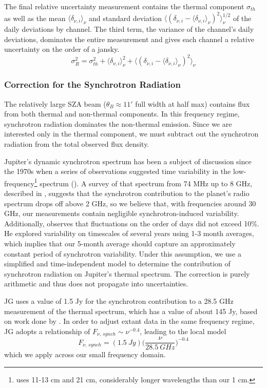 \documentclass{article}
\begin{document}
	The final relative uncertainty measurement contains the thermal component $\sigma_{th}$ as well as the mean $\langle \delta_{\nu, i} \rangle_{\nu}$ and standard deviation $\Big\langle (\delta_{\nu, i} - \langle \delta_{\nu, i} \rangle_{\nu})^{2} \Big\rangle_{\nu}^{1/2}$ of the daily deviations by channel.
	The third term, the variance of the channel's daily deviations, dominates the entire measurement and gives each channel a relative uncertainty on the order of a jansky.
	$$ \sigma_{R}^{2} = \sigma_{th}^{2} + \langle \delta_{\nu, i} \rangle_{\nu}^{2}
		 + \Big\langle (\delta_{\nu, i} - \langle \delta_{\nu, i} \rangle_{\nu})^{2} \Big\rangle_{\nu} $$


\subsubsection{Correction for the Synchrotron Radiation}

	The relatively large SZA beam ($\theta_{B} \approx 11'$ full width at half max) contains flux from both thermal and non-thermal components.
	In this frequency regime, synchrotron radiation dominates the non-thermal emission.
	Since we are interested only in the thermal component, we must subtract out the synchrotron radiation from the total observed flux density.

	Jupiter's dynamic synchrotron spectrum has been a subject of discussion since the 1970s when a series of observations suggested time variability in the low-frequency\footnote{\citealt{1976JGR....81.3380K} uses 11-13 cm and 21 cm, considerably longer wavelengths than our 1 cm.} spectrum (\citealt{1976JGR....81.3380K}).
	A survey of that spectrum from 74 MHz up to 8 GHz, described in \citealt{2003Icar..163..434D}, suggests that the synchrotron contribution to the planet's radio spectrum drops off above 2 GHz, so we believe that, with frequencies around 30 GHz, our measurements contain negligible synchrotron-induced variability.
	Additionally, \citealt{1976JGR....81.3380K} observes that fluctuations on the order of days did not exceed 10\%. He  explored variability on timescales of several years using 1-3 month averages, which implies that our 5-month average should capture an approximately constant period of synchrotron variability.
	Under this assumption, we use a simplified and time-independent model to determine the contribution of synchrotron radiation on Jupiter's thermal spectrum.
	The correction is purely arithmetic and thus does not propagate into uncertainties.

	JG uses a value of 1.5 Jy for the synchrotron contribution to a 28.5 GHz measurement of the thermal spectrum, which has a value of about 145 Jy, based on work done by \citealt{2003Icar..163..449D}.
	In order to adjust extant data in the same frequency regime, JG adopts a relationship of $F_{\nu,\,synch} \sim \nu^{-0.4}$, leading to the local model
	$$F_{\nu,\,synch} =  (1.5 \ Jy)\Bigg(\frac{\nu}{28.5 \ GHz}\Bigg)^{-0.4}$$
	which we apply across our small frequency domain.
\end{document}
